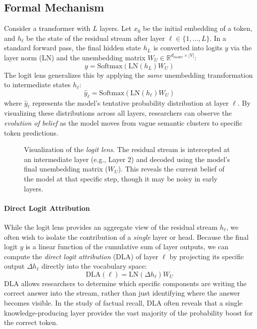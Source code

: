 \subsection{Formal Mechanism}
Consider a transformer with $L$ layers. Let $x_0$ be the initial embedding of a token, and $h_\ell$ be the state of the residual stream after layer $\ell \in \{1, \dots, L\}$. In a standard forward pass, the final hidden state $h_L$ is converted into logits $y$ via the layer norm (LN) and the unembedding matrix $W_U \in \mathbb{R}^{d_{model} \times |V|}$:
\begin{equation}
    y = \text{Softmax}(\text{LN}(h_L) W_U)
\end{equation}
The logit lens generalizes this by applying the \emph{same} unembedding transformation to intermediate states $h_\ell$:
\begin{equation}
    \hat{y}_\ell = \text{Softmax}(\text{LN}(h_\ell) W_U)
\end{equation}
where $\hat{y}_\ell$ represents the model's tentative probability distribution at layer $\ell$. By visualizing these distributions across all layers, researchers can observe the \emph{evolution of belief} as the model moves from vague semantic clusters to specific token predictions.

\begin{figure}[!ht]
    \centering
    \resizebox{0.65\textwidth}{!}{
        
    }
    \caption{Visualization of the \emph{logit lens}. The residual stream is intercepted at an intermediate layer (e.g., Layer 2) and decoded using the model's final unembedding matrix ($W_U$). This reveals the current belief of the model at that specific step, though it may be noisy in early layers.}
    \label{fig:logit_lens}
\end{figure}


\paragraph{Direct Logit Attribution}
While the logit lens provides an aggregate view of the residual stream $h_\ell$, we often wish to isolate the contribution of a \emph{single} layer or head. Because the final logit $y$ is a linear function of the cumulative sum of layer outputs, we can compute the \emph{direct logit attribution} (DLA) of layer $\ell$ by projecting its specific output $\Delta h_\ell$ directly into the vocabulary space:
\begin{equation}
    \text{DLA}(\ell) = \text{LN}(\Delta h_\ell) W_U
\end{equation}
DLA allows researchers to determine which specific components are writing the correct answer into the stream, rather than just identifying where the answer becomes visible. In the study of factual recall, DLA often reveals that a single knowledge-producing layer provides the vast majority of the probability boost for the correct token.

